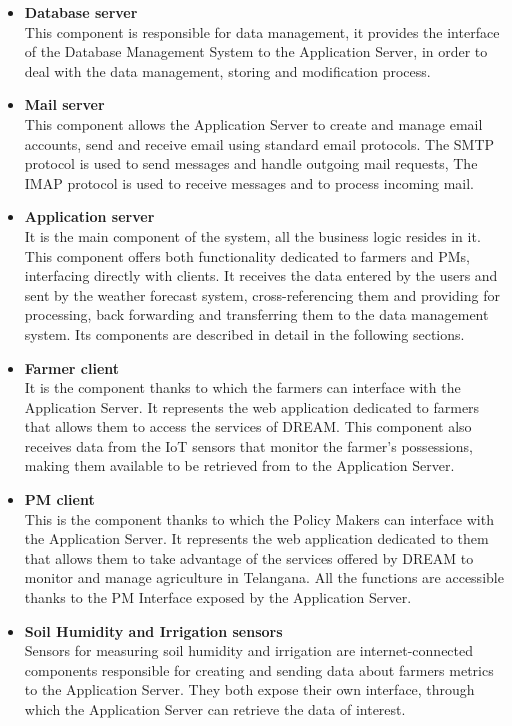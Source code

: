 \documentclass[10pt]{article} %
\begin{document}
\begin{itemize}
    \item \textbf{Database server}\\This component is responsible for data management, 
    it provides the interface of the Database Management System to the Application Server, in order to 
    deal with the data management, storing and modification process.
    \item \textbf{Mail server}\\This component allows the Application Server to create and manage email accounts, 
    send and receive email using standard email protocols. The SMTP protocol is used to send messages and handle outgoing mail requests, 
    The IMAP protocol is used to receive messages and to process incoming mail.
    \item \textbf{Application server}\\It is the main component of the system, all the business logic 
    resides in it. This component offers both functionality dedicated to farmers and PMs, 
    interfacing directly with clients. It receives the data entered by the users and sent 
    by the weather forecast system, cross-referencing them and providing for processing, 
    back forwarding and transferring them to the data management system. Its components are 
    described in detail in the following sections.
    \item \textbf{Farmer client}\\It is the component thanks to which the farmers can interface 
    with the Application Server. It represents the web application dedicated to farmers that allows 
    them to access the services of DREAM. This component also receives data from the IoT sensors that 
    monitor the farmer's possessions, making them available to be retrieved from to the Application Server.
    \item \textbf{PM client}\\This is the component thanks to which the Policy Makers can interface 
    with the Application Server. It represents the web application dedicated to them that allows 
    them to take advantage of the services offered by DREAM to monitor and manage agriculture in 
    Telangana. All the functions are accessible thanks to the PM Interface exposed by the Application Server.
    \item \textbf{Soil Humidity and Irrigation sensors}\\
    Sensors for measuring soil humidity and irrigation are 
    internet-connected components responsible for creating and sending data about farmers metrics to the Application Server. 
    They both expose their own interface, through which the Application Server can retrieve the data of interest.
\end{itemize}
\end{document}
